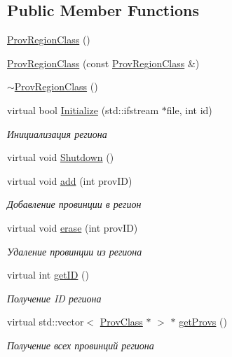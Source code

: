\subsection*{Public Member Functions}
\begin{DoxyCompactItemize}
\item 
\hyperlink{class_prov_region_class_a82d964ce146ae6e8cdc6196d71ab0e14}{Prov\+Region\+Class} ()
\item 
\hyperlink{class_prov_region_class_a53356bc2db32a0e8713e5a5d69a55ec5}{Prov\+Region\+Class} (const \hyperlink{class_prov_region_class}{Prov\+Region\+Class} \&)
\item 
\hyperlink{class_prov_region_class_a9e01b5ae15e07ebb08210ea7456360d2}{$\sim$\+Prov\+Region\+Class} ()
\item 
virtual bool \hyperlink{class_prov_region_class_a733b3a8580bd1bb038295a5b8ab4f1a0}{Initialize} (std\+::ifstream $\ast$file, int id)
\begin{DoxyCompactList}\small\item\em Инициализация региона \end{DoxyCompactList}\item 
virtual void \hyperlink{class_prov_region_class_adf3f702c865e613515590fb928a5eaf1}{Shutdown} ()
\item 
virtual void \hyperlink{class_prov_region_class_a47f41cef997877d288ea420dca7b9e81}{add} (int prov\+ID)
\begin{DoxyCompactList}\small\item\em Добавление провинции в регион \end{DoxyCompactList}\item 
virtual void \hyperlink{class_prov_region_class_ad28dbe98716517339922d6c4e0433611}{erase} (int prov\+ID)
\begin{DoxyCompactList}\small\item\em Удаление провинции из региона \end{DoxyCompactList}\item 
virtual int \hyperlink{class_prov_region_class_ab6f83c85a913b7f9ac3f6839b3386793}{get\+ID} ()
\begin{DoxyCompactList}\small\item\em Получение ID региона \end{DoxyCompactList}\item 
virtual std\+::vector$<$ \hyperlink{class_prov_class}{Prov\+Class} $\ast$ $>$ $\ast$ \hyperlink{class_prov_region_class_a31c1bdb93bda5a0bd0fc66382d39473e}{get\+Provs} ()
\begin{DoxyCompactList}\small\item\em Получение всех провинций региона \end{DoxyCompactList}\end{DoxyCompactItemize}

